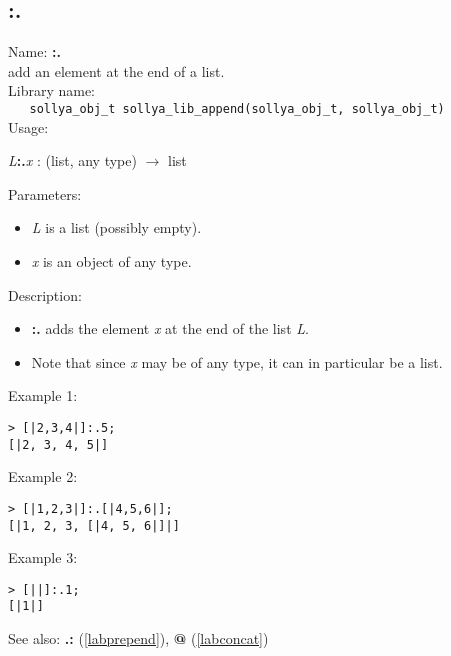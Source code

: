 \subsection{:.}
\label{labappend}
\noindent Name: \textbf{:.}\\
\phantom{aaa}add an element at the end of a list.\\[0.2cm]
\noindent Library name:\\
\verb|   sollya_obj_t sollya_lib_append(sollya_obj_t, sollya_obj_t)|\\[0.2cm]
\noindent Usage: 
\begin{center}
\emph{L}\textbf{:.}\emph{x} : (\textsf{list}, \textsf{any type}) $\rightarrow$ \textsf{list}\\
\end{center}
Parameters: 
\begin{itemize}
\item \emph{L} is a list (possibly empty).
\item \emph{x} is an object of any type.
\end{itemize}
\noindent Description: \begin{itemize}

\item \textbf{:.} adds the element \emph{x} at the end of the list \emph{L}.

\item Note that since \emph{x} may be of any type, it can in particular be a list.
\end{itemize}
\noindent Example 1: 
\begin{center}\begin{minipage}{15cm}\begin{Verbatim}[frame=single]
> [|2,3,4|]:.5;
[|2, 3, 4, 5|]
\end{Verbatim}
\end{minipage}\end{center}
\noindent Example 2: 
\begin{center}\begin{minipage}{15cm}\begin{Verbatim}[frame=single]
> [|1,2,3|]:.[|4,5,6|];
[|1, 2, 3, [|4, 5, 6|]|]
\end{Verbatim}
\end{minipage}\end{center}
\noindent Example 3: 
\begin{center}\begin{minipage}{15cm}\begin{Verbatim}[frame=single]
> [||]:.1;
[|1|]
\end{Verbatim}
\end{minipage}\end{center}
See also: \textbf{.:} (\ref{labprepend}), \textbf{@} (\ref{labconcat})
